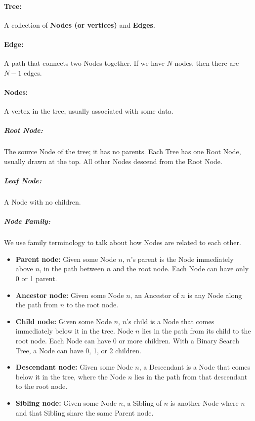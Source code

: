 \documentclass[a4paper,12pt,oneside]{book}
\begin{document}
    \paragraph{Tree:} A collection of \textbf{Nodes (or vertices)} and \textbf{Edges}.

    \paragraph{Edge:} A path that connects two Nodes together. If we have $N$ nodes,
        then there are $N-1$ edges.

    \paragraph{Nodes:} A vertex in the tree, usually associated with some data.

    \subparagraph{Root Node:} The source Node of the tree; it has no parents.
    Each Tree has one Root Node, usually drawn at the top. All
    other Nodes descend from the Root Node.
    
    \subparagraph{Leaf Node:} A Node with no children.
    
    \subparagraph{Node Family:} We use family terminology to talk about
        how Nodes are related to each other.

        \begin{itemize}
            \item   \textbf{Parent node:} Given some Node $n$, $n$'s parent
                is the Node immediately above $n$, in the path between $n$
                and the root node. Each Node can have only 0 or 1 parent.

            \item   \textbf{Ancestor node:} Given some Node $n$, an Ancestor
                of $n$ is any Node along the path from $n$ to the root node.

            \item   \textbf{Child node:} Given some Node $n$, $n$'s child
                is a Node that comes immediately below it in the tree.
                Node $n$ lies in the path from its child to the root node.
                Each Node can have 0 or more children. With a Binary Search Tree,
                a Node can have 0, 1, or 2 children.

            \item   \textbf{Descendant node:} Given some Node $n$, a
                Descendant is a Node that comes below it in the tree, where
                the Node $n$ lies in the path from that descendant to the root node.

            \item   \textbf{Sibling node:} Given some Node $n$, a Sibling
                of $n$ is another Node where $n$ and that Sibling share the same
                Parent node.
        \end{itemize}
\end{document}
